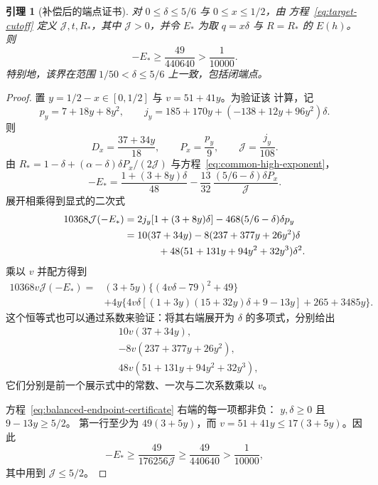 \documentclass[11pt,a4paper]{article}
\numberwithin{equation}{section}
\numberwithin{figure}{section}
\newtheorem{lemma}[theorem]{引理}
\theoremstyle{definition}
\theoremstyle{remark}
\begin{document}
\begin{lemma}[补偿后的端点证书]\label{lem:balanced-endpoint}
对 \(0\le\delta\le5/6\) 与 \(0\le x\le1/2\)，由
方程~\eqref{eq:target-cutoff} 定义 \(\mathcal J,t,R_*\)，其中
\(\mathcal J>0\)，并令 \(E_*\) 为取
\(q=x\delta\) 与 \(R=R_*\) 的 \(E(h)\)。则
\[
 -E_*\ge\frac{49}{440640}>\frac1{10000}.
\]
特别地，该界在范围
\(1/50<\delta\le5/6\) 上一致，包括闭端点。
\end{lemma}

\begin{proof}
置 \(y=1/2-x\in[0,1/2]\) 与 \(v=51+41y\)。为验证该
计算，记
\[
 p_y=7+18y+8y^2,\qquad
 j_y=185+170y+(-138+12y+96y^2)\delta.
\]
则
\[
 D_x=\frac{37+34y}{18},\qquad
 P_x=\frac{p_y}{9},\qquad
 \mathcal J=\frac{j_y}{108}.
\]
由 \(R_*=1-\delta+(\alpha-\delta)\delta P_x/(2\mathcal J)\)
与方程~\eqref{eq:common-high-exponent}，
\[
 -E_*=
 \frac{1+(3+8y)\delta}{48}
 -\frac{13}{32}\,
   \frac{(5/6-\delta)\delta P_x}{\mathcal J}.
\]
展开相乘得到显式的二次式
\[
 \begin{split}
 10368\mathcal J(-E_*)
 &=2j_y[1+(3+8y)\delta]
     -468(5/6-\delta)\delta p_y\\
 &=10(37+34y)
   -8(237+377y+26y^2)\delta\\
 &\hspace{12mm}
   +48(51+131y+94y^2+32y^3)\delta^2.
 \end{split}
\]
乘以 \(v\) 并配方得到
\begin{equation}
 \begin{aligned}
 10368v\mathcal J(-E_*)
 ={}&(3+5y)\bigl\{(4v\delta-79)^2+49\bigr\}\\
 &+4y\bigl\{
 4v\delta[(1+3y)(15+32y)\delta+9-13y]
       +265+3485y\bigr\}.
 \end{aligned}
 \label{eq:balanced-endpoint-certificate}
\end{equation}
这个恒等式也可以通过系数来验证：将其右端展开为
\(\delta\) 的多项式，分别给出
\[
 \begin{split}
 &10v(37+34y),\\
 &-8v(237+377y+26y^2),\\
 &48v(51+131y+94y^2+32y^3),
 \end{split}
\]
它们分别是前一个展示式中的常数、一次与二次系数乘以 \(v\)。

方程~\eqref{eq:balanced-endpoint-certificate} 右端的每一项都非负：
\(y,\delta\ge0\) 且 \(9-13y\ge5/2\)。
第一行至少为 \(49(3+5y)\)，而
\(v=51+41y\le17(3+5y)\)。因此
\[
 -E_*\ge\frac{49}{176256\mathcal J}
       \ge\frac{49}{440640}>\frac1{10000},
\]
其中用到 \(\mathcal J\le5/2\)。
\end{proof}
\end{document}
